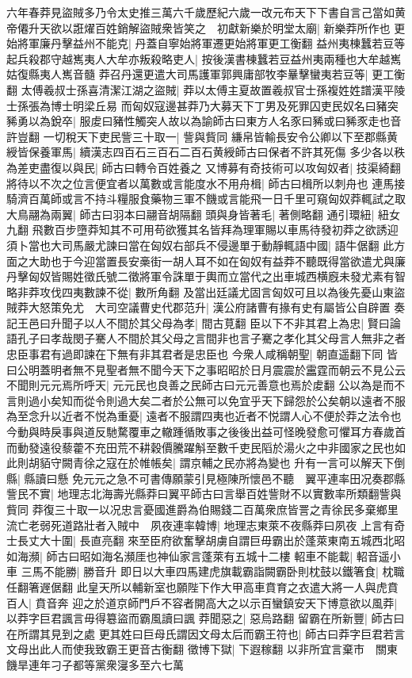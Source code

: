 六年春莽見盜賊多乃令太史推三萬六千歲歷紀六歲一改元布天下下書自言己當如黄帝僊升天欲以誑燿百姓銷解盜賊衆皆笑之　初獻新樂於明堂太廟|{
	新樂莽所作也}
更始將軍廉丹擊益州不能克|{
	丹蓋自寧始將軍遷更始將軍更工衡翻}
益州夷棟蠶若豆等起兵殺郡守越嶲夷人大牟亦叛殺略吏人|{
	按後漢書棟蠶若豆益州夷兩種也大牟越嶲姑復縣夷人嶲音髓}
莽召丹還更遣大司馬護軍郭興庸部牧李曅擊蠻夷若豆等|{
	更工衡翻}
太傅羲叔士孫喜清潔江湖之盜賊|{
	莽以太傅主夏故置羲叔官士孫複姓姓譜漢平陵士孫張為博士明梁丘易}
而匈奴寇邊甚莽乃大募天下丁男及死罪囚吏民奴名曰豬突豨勇以為銳卒|{
	服䖍曰豬性觸突人故以為諭師古曰東方人名豕曰豨或曰豨豕走也音許豈翻}
一切稅天下吏民訾三十取一|{
	訾與貲同}
縑帛皆輸長安令公卿以下至郡縣黄綬皆保養軍馬|{
	續漢志四百石三百石二百石黄綬師古曰保者不許其死傷}
多少各以秩為差吏盡復以與民|{
	師古曰轉令百姓養之}
又博募有奇技術可以攻匈奴者|{
	技渠綺翻}
將待以不次之位言便宜者以萬數或言能度水不用舟楫|{
	師古曰楫所以刺舟也}
連馬接騎濟百萬師或言不持斗糧服食藥物三軍不饑或言能飛一日千里可窺匈奴莽輒試之取大鳥翮為兩翼|{
	師古曰羽本曰翮音胡隔翻}
頭與身皆著毛|{
	著側略翻}
通引環紐|{
	紐女九翻}
飛數百步墮莽知其不可用苟欲獲其名皆拜為理軍賜以車馬待發初莽之欲誘迎須卜當也大司馬嚴尤諫曰當在匈奴右部兵不侵邊單于動靜輒語中國|{
	語牛倨翻}
此方面之大助也于今迎當置長安槀街一胡人耳不如在匈奴有益莽不聽既得當欲遣尤與廉丹擊匈奴皆賜姓徵氏號二徵將軍令誅單于輿而立當代之出車城西横廐未發尤素有智略非莽攻伐四夷數諫不從|{
	數所角翻}
及當出廷議尤固言匈奴可且以為後先憂山東盜賊莽大怒策免尤　大司空議曹史代郡范升|{
	漢公府諸曹有掾有史有屬皆公自辟置}
奏記王邑曰升聞子以人不間於其父母為孝|{
	間古莧翻}
臣以下不非其君上為忠|{
	賢曰論語孔子曰孝哉閔子騫人不間於其父母之言間非也言子騫之孝化其父母言人無非之者忠臣事君有過即諫在下無有非其君者是忠臣也}
今衆人咸稱朝聖|{
	朝直遥翻下同}
皆曰公明蓋明者無不見聖者無不聞今天下之事昭昭於日月震震於靁霆而朝云不見公云不聞則元元焉所呼天|{
	元元民也良善之民師古曰元元善意也焉於䖍翻}
公以為是而不言則過小矣知而從令則過大矣二者於公無可以免宜乎天下歸怨於公矣朝以遠者不服為至念升以近者不悦為重憂|{
	遠者不服謂四夷也近者不悦謂人心不便於莽之法令也}
今動與時戾事與道反馳騖覆車之轍踵循敗事之後後出益可怪晚發愈可懼耳方春歲首而動發遠役藜藿不充田荒不耕穀價騰躍斛至數千吏民䧟於湯火之中非國家之民也如此則胡貊守闕青徐之寇在於帷帳矣|{
	謂京輔之民亦將為變也}
升有一言可以解天下倒縣|{
	縣讀曰懸}
免元元之急不可書傳願蒙引見極陳所懷邑不聽　翼平連率田况奏郡縣訾民不實|{
	地理志北海壽光縣莽曰翼平師古曰言舉百姓訾財不以實數率所類翻訾與貲同}
莽復三十取一以况忠言憂國進爵為伯賜錢二百萬衆庶皆詈之青徐民多棄鄉里流亡老弱死道路壯者入賊中　夙夜連率韓博|{
	地理志東萊不夜縣莽曰夙夜}
上言有奇士長丈大十圍|{
	長直亮翻}
來至臣府欲奮擊胡虜自謂巨毋霸出於蓬萊東南五城西北昭如海瀕|{
	師古曰昭如海名瀕厓也神仙家言蓬萊有五城十二樓}
軺車不能載|{
	軺音遥小車}
三馬不能勝|{
	勝音升}
即日以大車四馬建虎旗載霸詣闕霸卧則枕鼓以鐵箸食|{
	枕職任翻箸遟倨翻}
此皇天所以輔新室也願陛下作大甲高車賁育之衣遣大將一人與虎賁百人|{
	賁音奔}
迎之於道京師門戶不容者開高大之以示百蠻鎮安天下博意欲以風莽|{
	以莽字巨君諷言毋得簒盜而霸風讀曰諷}
莽聞惡之|{
	惡烏路翻}
留霸在所新豐|{
	師古曰在所謂其見到之處}
更其姓曰巨母氏謂因文母太后而霸王符也|{
	師古曰莽字巨君若言文母出此人而使我致霸王更音古衡翻}
徵博下獄|{
	下遐稼翻}
以非所宜言棄市　關東饑旱連年刁子都等黨衆寖多至六七萬

